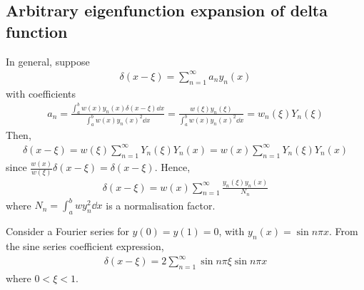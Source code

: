 \subsection{Arbitrary eigenfunction expansion of delta function}
In general, suppose
\begin{align*}
	\delta(x-\xi) = \sum_{n=1}^\infty a_n y_n(x)
\end{align*}
with coefficients
\begin{align*}
	a_n = \frac{\int_a^b w(x) y_n(x) \delta(x-\xi) \dd{x}}{\int_a^b w(x) y_n(x)^2 \dd{x}} = \frac{w(\xi) y_n(\xi)}{\int_a^b w(x) y_n(x)^2 \dd{x}} = w_n(\xi) Y_n(\xi)
\end{align*}
Then,
\begin{align*}
	\delta(x-\xi) = w(\xi) \sum_{n=1}^\infty Y_n(\xi) Y_n(x) = w(x) \sum_{n=1}^\infty Y_n(\xi) Y_n(x)
\end{align*}
since $\frac{w(x)}{w(\xi)} \delta(x - \xi) = \delta(x - \xi)$.
Hence,
\begin{align*}
	\delta(x-\xi) = w(x) \sum_{n=1}^\infty \frac{y_n(\xi) y_n(x)}{N_n}
\end{align*}
where $N_n = \int_a^b w y_n^2 \dd{x}$ is a normalisation factor.
\begin{example}
	Consider a Fourier series for $y(0) = y(1) = 0$, with $y_n(x) = \sin n \pi x$.
	From the sine series coefficient expression,
	\begin{align*}
		\delta(x-\xi) = 2\sum_{n=1}^\infty \sin n \pi \xi \sin n \pi x
	\end{align*}
	where $0 < \xi < 1$.
\end{example}

